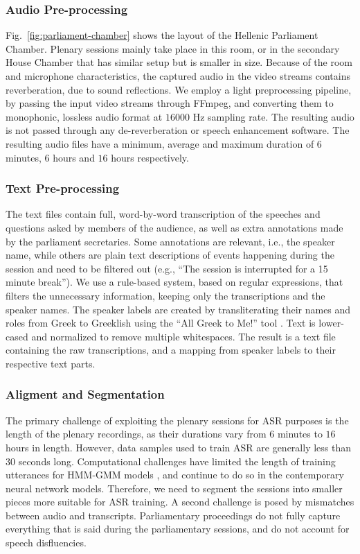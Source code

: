 \documentclass[journal]{IEEEtran}
\begin{document}
\subsubsection{Audio Pre-processing}
Fig.~\ref{fig:parliament-chamber} shows the layout of the Hellenic Parliament Chamber. Plenary sessions mainly take place in this room, or in the secondary House Chamber that has similar setup but is smaller in size. Because of the room and microphone characteristics, the captured audio in the video streams contains reverberation, due to sound reflections. We employ a light preprocessing pipeline, by passing the input video streams through FFmpeg, and converting them to monophonic, lossless audio format at $16000$ Hz sampling rate. The resulting audio is not passed through any de-reverberation or speech enhancement software. The resulting audio files have a minimum, average and maximum duration of $6$ minutes, $6$ hours and $16$ hours respectively.

\subsubsection{Text Pre-processing}
The text files contain full, word-by-word transcription of the speeches and questions asked by members of the audience, as well as extra annotations made by the parliament secretaries. Some annotations are relevant, i.e., the speaker name, while others are plain text descriptions of events happening during the session and need to be filtered out (e.g., ``The session is interrupted for a 15 minute break''). We use a rule-based system, based on regular expressions, that filters the unnecessary information, keeping only the transcriptions and the speaker names. The speaker labels are created by transliterating their names and roles from Greek to Greeklish using the ``All Greek to Me!'' tool \cite{chalamandaris2006all}. Text is lower-cased and normalized to remove multiple whitespaces.  The result is a text file containing the raw transcriptions, and a mapping from speaker labels to their respective text parts.

\subsubsection{Aligment and Segmentation} The primary challenge of exploiting the plenary sessions for ASR purposes is
the length of the plenary recordings, as their durations vary from $6$ minutes to $16$ hours in length.
However, data samples used to train ASR are generally less than $30$ seconds long. Computational challenges have limited the length of training utterances for HMM-GMM models \cite{MEYER2006532},  and continue to do so in the contemporary
neural network models. Therefore, we need to segment the sessions
into smaller pieces more suitable for ASR training.
A second challenge is posed by mismatches between audio and transcripts. Parliamentary proceedings do not fully capture everything that is said during the parliamentary sessions, and do not account for speech disfluencies.
\end{document}
